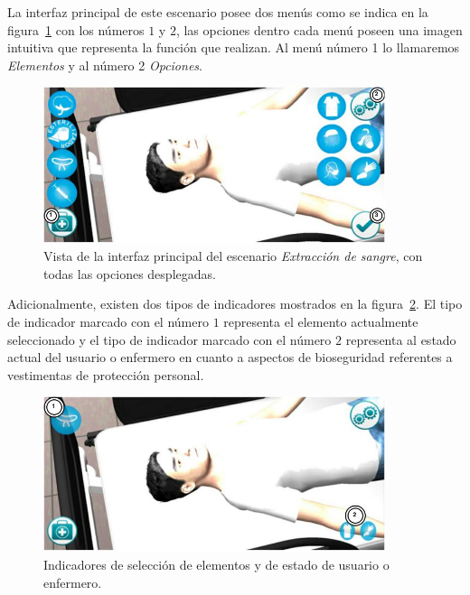 La interfaz principal de este escenario posee dos menús como se indica en la
figura~\ref{fig:hemocultivo_gui} con los números $1$ y $2$, las opciones dentro
cada menú poseen una imagen intuitiva que representa la función que realizan. Al
menú número 1 lo llamaremos \emph{Elementos} y al número 2 \emph{Opciones}.

\begin{figure}[H]
\centering
\includegraphics[width=10cm]{solucion/images/hemocultivo_menus.jpg}
\caption{Vista de la interfaz principal del escenario \emph{Extracción de
        sangre}, con todas las opciones desplegadas.}
\label{fig:hemocultivo_gui}
\end{figure}

Adicionalmente, existen dos tipos de indicadores mostrados en la
figura~\ref{fig:hemocultivo_seleccion}. El tipo de indicador marcado con el número $1$
representa el elemento actualmente seleccionado y el tipo de indicador marcado
con el número $2$ representa al estado actual del usuario o enfermero en cuanto a
aspectos de bioseguridad referentes a vestimentas de protección personal.

\begin{figure}[H]
\centering
\includegraphics[width=10cm]{solucion/images/hemocultivo_seleccion.jpg}
\caption{Indicadores de selección de elementos y de estado de usuario o enfermero.}
\label{fig:hemocultivo_seleccion}
\end{figure}

